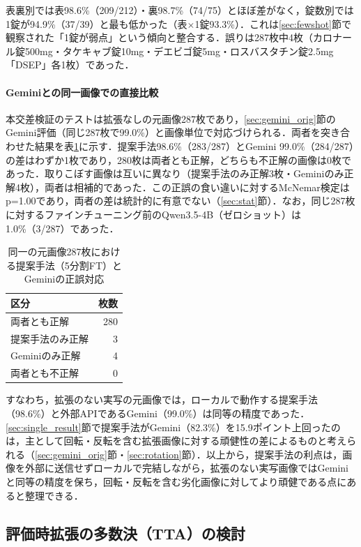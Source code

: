 \documentclass[dvipdfmx]{jsarticle}
\begin{document}
表裏別では表98.6\%（209/212）・裏98.7\%（74/75）とほぼ差がなく，錠数別では1錠が94.9\%（37/39）と最も低かった（表$\times$1錠93.3\%）．これは\ref{sec:fewshot}節で観察された「1錠が弱点」という傾向と整合する．誤りは287枚中4枚（カロナール錠500mg・タケキャブ錠10mg・デエビゴ錠5mg・ロスバスタチン錠2.5mg「DSEP」各1枚）であった．

\paragraph{Geminiとの同一画像での直接比較}
本交差検証のテストは拡張なしの元画像287枚であり，\ref{sec:gemini_orig}節のGemini評価（同じ287枚で99.0\%）と画像単位で対応づけられる．両者を突き合わせた結果を表\ref{tab:cv_gemini}に示す．提案手法98.6\%（283/287）とGemini 99.0\%（284/287）の差はわずか1枚であり，280枚は両者とも正解，どちらも不正解の画像は0枚であった．取りこぼす画像は互いに異なり（提案手法のみ正解3枚・Geminiのみ正解4枚），両者は相補的であった．この正誤の食い違いに対するMcNemar検定はp=1.00であり，両者の差は統計的に有意でない（\ref{sec:stat}節）．なお，同じ287枚に対するファインチューニング前のQwen3.5-4B（ゼロショット）は1.0\%（3/287）であった．

\begin{table}[htbp]
\centering
\caption{同一の元画像287枚における提案手法（5分割FT）とGeminiの正誤対応}
\label{tab:cv_gemini}
\begin{tabular}{lr}
\hline
区分 & 枚数 \\
\hline
両者とも正解 & 280 \\
提案手法のみ正解 & 3 \\
Geminiのみ正解 & 4 \\
両者とも不正解 & 0 \\
\hline
\end{tabular}
\end{table}

すなわち，拡張のない実写の元画像では，ローカルで動作する提案手法（98.6\%）と外部APIであるGemini（99.0\%）は同等の精度であった．\ref{sec:single_result}節で提案手法がGemini（82.3\%）を15.9ポイント上回ったのは，主として回転・反転を含む拡張画像に対する頑健性の差によるものと考えられる（\ref{sec:gemini_orig}節・\ref{sec:rotation}節）．以上から，提案手法の利点は，画像を外部に送信せずローカルで完結しながら，拡張のない実写画像ではGeminiと同等の精度を保ち，回転・反転を含む劣化画像に対してより頑健である点にあると整理できる．

\subsection{評価時拡張の多数決（TTA）の検討}\label{sec:tta}
\end{document}

